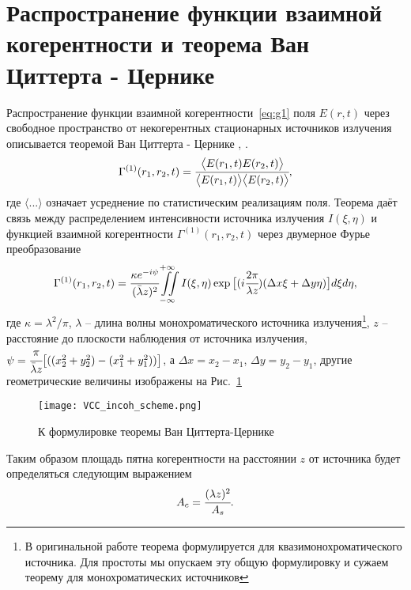 \section{Распространение функции взаимной когерентности и теорема Ван Циттерта - Цернике}
Распространение функции взаимной когерентности~\ref{eq:g1} поля $E(r, t)$ через свободное пространство от некогерентных стационарных источников излучения описывается теоремой Ван Циттерта - Цернике \cite{van_cittert_wahrscheinliche_1934}, \cite{zernike_concept_1938}. 
\begin{align}
	\Gamma^{(1)} (r_1, r_2, t) = \cfrac{\big \langle {E}(r_1, t) {E}(r_2, t) \big \rangle}{\big \langle {E}(r_1, t)\big \rangle \big \langle{E}(r_2, t) \big \rangle}, 
	\label{eq:g1} 
\end{align}
где $\big \langle ... \big \rangle$ означает усреднение по статистическим реализациям поля. Теорема даёт связь между распределением интенсивности источника излучения $I(\xi, \eta)$ и функцией взаимной когерентности $\Gamma^{(1)} (r_1, r_2, t)$ через двумерное Фурье преобразование
\begin{align}
	\Gamma^{(1)} (r_1, r_2, t) = \cfrac{\kappa e^{-i\psi}}{(\bar{\lambda}z)^2} \iint \limits_{-\infty}^{+\infty} I(\xi, \eta) \exp{\big [(i \cfrac{2 \pi}{{\lambda}z}) (\Delta x \xi + \Delta y \eta)\big]}d\xi d\eta, 
	\label{eq:van_cittert_zernike_theorem} 
\end{align}
где $\kappa = {\lambda}^2 / \pi$, ${\lambda}$ -- длина волны монохроматического источника излучения\footnote{В оригинальной работе теорема формулируется для квазимонохроматического источника. Для простоты мы опускаем эту общую формулировку и сужаем теорему для монохроматических источников}, $z$ -- расстояние до плоскости наблюдения от источника излучения, $\psi = \cfrac{\pi}{\bar{\lambda} z}\big[((x^2_2 + y^2_2) - (x^2_1 + y^2_1)) \big]$, а $\Delta x = x_2 - x_1$, $\Delta y = y_2 - y_1$, другие геометрические величины изображены на Рис.~\ref{fig:VCC_scheme_incoh} 
\begin{figure}[H] 
	\centering 	\texttt{[image: VCC\_incoh\_scheme.png]}
	\caption{К формулировке теоремы Ван Циттерта-Цернике}
	\label{fig:VCC_scheme_incoh}
\end{figure}
Таким образом площадь пятна когерентности на расстоянии $z$ от источника будет определяться следующим выражением
\begin{align}
	A_c = \cfrac{({\lambda} z)^2}{A_s}.
	\label{eq:VCC}
\end{align}

